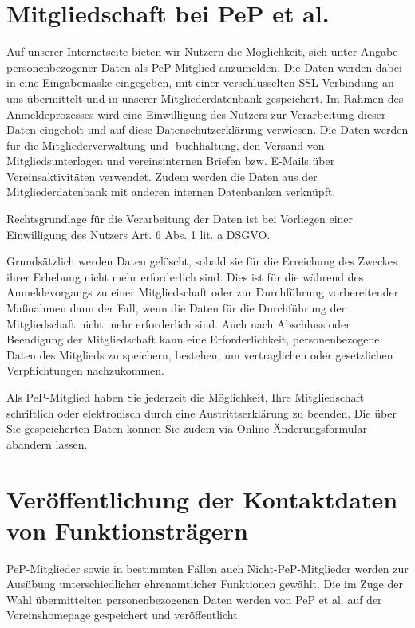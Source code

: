 \documentclass[
  fontsize=12pt,
  paper=a4,
  DIV14,
  parskip,
]{scrartcl}
\begin{document}
\section{Mitgliedschaft bei PeP et al.}

Auf unserer Internetseite bieten wir Nutzern die Möglichkeit, sich unter
Angabe personenbezogener Daten als PeP-Mitglied anzumelden.
Die Daten werden dabei in eine Eingabemaske eingegeben, mit einer
verschlüsselten SSL-Verbindung an uns übermittelt und in unserer
Mitgliederdatenbank gespeichert.
Im Rahmen des Anmeldeprozesses wird eine Einwilligung des Nutzers zur
Verarbeitung dieser Daten eingeholt und auf diese Datenschutzerklärung
verwiesen.
Die Daten werden für die Mitgliederverwaltung und -buchhaltung, den Versand
von Mitgliedsunterlagen und vereinsinternen Briefen bzw. E-Mails über
Vereinsaktivitäten verwendet.
Zudem werden die Daten aus der Mitgliederdatenbank mit anderen internen
Datenbanken verknüpft.

Rechtsgrundlage für die Verarbeitung der Daten ist bei Vorliegen einer
Einwilligung des Nutzers Art. 6 Abs. 1 lit. a DSGVO.

Grundsätzlich werden Daten gelöscht, sobald sie für die Erreichung des
Zweckes ihrer Erhebung nicht mehr erforderlich sind.
Dies ist für die während des Anmeldevorgangs zu einer Mitgliedschaft oder zur
Durchführung vorbereitender Maßnahmen dann der Fall, wenn die Daten für die
Durchführung der Mitgliedschaft nicht mehr erforderlich sind.
Auch nach Abschluss oder Beendigung der Mitgliedschaft kann eine
Erforderlichkeit, personenbezogene Daten des Mitglieds zu speichern,
bestehen, um vertraglichen oder gesetzlichen Verpflichtungen nachzukommen.

Als PeP-Mitglied haben Sie jederzeit die Möglichkeit, Ihre Mitgliedschaft
schriftlich oder elektronisch durch eine Austrittserklärung zu beenden.
Die über Sie gespeicherten Daten können Sie zudem via
Online-Änderungsformular abändern lassen.

\section{Veröffentlichung der Kontaktdaten von Funktionsträgern}

PeP-Mitglieder sowie in bestimmten Fällen auch Nicht-PeP-Mitglieder werden
zur Ausübung unterschiedlicher ehrenamtlicher Funktionen gewählt.
Die im Zuge der Wahl übermittelten personenbezogenen Daten werden von PeP et
al. auf der Vereinshomepage gespeichert und veröffentlicht.
\end{document}
